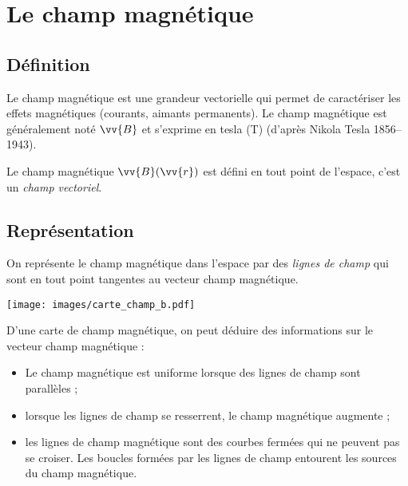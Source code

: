 \documentclass{cours}
\begin{document}

\setcounter{chapter}{22}
\chapter{Le champ magnétique}

\section{Définition}%
\label{sec:definition}

Le champ magnétique est une grandeur vectorielle qui permet de caractériser les effets magnétiques (courants, aimants permanents). Le champ magnétique est généralement noté $\vv{B}$ et s'exprime en tesla (T) (d'après Nikola Tesla 1856--1943). 

Le champ magnétique $\vv{B}(\vv{r})$ est défini en tout point de l'espace, c'est un \emph{champ vectoriel}. 

\section{Représentation}%
\label{sec:representation}

On représente le champ magnétique dans l'espace par des \emph{lignes de champ} qui sont en tout point tangentes au vecteur champ magnétique.

\begin{center}
  \texttt{[image: images/carte\_champ\_b.pdf]}
\end{center}
D'une carte de champ magnétique, on peut déduire des informations sur le vecteur champ magnétique :
\begin{itemize}
  \item Le champ magnétique est uniforme lorsque des lignes de champ sont parallèles ; 
  \item lorsque les lignes de champ se resserrent, le champ magnétique augmente ;
  \item les lignes de champ magnétique sont des courbes fermées qui ne peuvent pas se croiser. Les boucles formées par les lignes de champ entourent les sources du champ magnétique.
\end{itemize}
\end{document}
